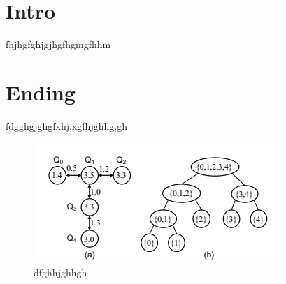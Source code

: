 \documentclass{article}
\begin{document}
	\section{Intro}
		fhjhgfghjgjhgfhgmgfhhm
	\section{Ending}
		fdgghgjghgfxhj,xgfhjghhg,gh
		
		\begin{figure}[h]
			\centering
			\includegraphics[width=0.7\linewidth]{fig1}
			\caption{dfghhjghhgh}
			\label{fig:fig1}
		\end{figure}
\end{document}
